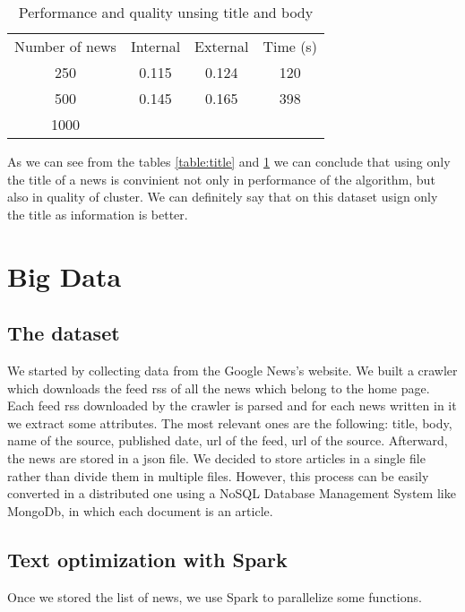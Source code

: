 \documentclass{acm_proc_article-sp}
\begin{document}
\begin{table}[!ht]
\centering
\label{table:body}
\begin{tabular}{cccc}
Number of news & Internal & External & Time (s) \\
250            & 0.115    & 0.124    & 120      \\
500            & 0.145    & 0.165    & 398      \\
1000           &          &          &   
\end{tabular}
\caption{Performance and quality unsing title and body}
\end{table}


As we can see from the tables \ref{table:title} and \ref{table:body} we can conclude that using only the title of a news is convinient not only in performance of the algorithm, but also in quality of cluster. We can definitely say that on this dataset usign only the title as information is better.





\section{Big Data}
\vspace{2mm}

\subsection{The dataset}
\vspace{2mm}
We started by collecting data from the Google News's website. We built a crawler which downloads the feed rss of all the news which belong to the home page. 
Each feed rss downloaded by the crawler is parsed and for each news written in it we extract some attributes. The most relevant ones are the following: title, body, name of the source, published date, url of the feed, url of the source.
Afterward, the news are stored in a json file. We decided to store articles in a single file rather than divide them in multiple files. However, this process can be easily converted in a distributed one using a NoSQL Database Management System like MongoDb, in which each document is an article.

\subsection{Text optimization with Spark}
\vspace{2mm}
Once we stored the list of news, we use Spark to parallelize some functions.
\end{document}
